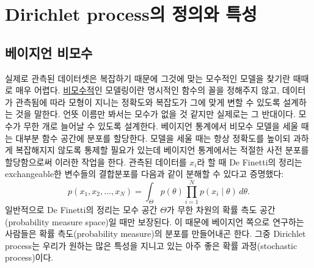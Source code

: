 \documentclass[a4paper, 10pt]{book}
\begin{document}
\nocite{*}

\chapter{Dirichlet process의 정의와 특성}

\section{베이지언 비모수}
  실제로 관측된 데이터셋은 복잡하기 때문에 그것에 맞는 모수적인 모델을 찾기란 때때로 매우 어렵다. \underline{비모수적}인 모델링이란 명시적인 함수의 꼴을 정해주지 않고, 데이터가 관측됨에 따라 모형이 지니는 정확도와 복잡도가 그에 맞게 변할 수 있도록 설계하는 것을 말한다. 언뜻 이름만 봐서는 모수가 없을 것 같지만 실제로는 그 반대이다. 모수가 무한 개로 늘어날 수 있도록 설계한다. 베이지언 통계에서 비모수 모델을 세울 때는 대부분 함수 공간에 분포를 할당한다. 모델을 세울 때는 항상 정확도를 높이되 과하게 복잡해지지 않도록 통제할 필요가 있는데 베이지언 통계에서는 적절한 사전 분포를 할당함으로써 이러한 작업을 한다. 관측된 데이터를 $x_{i}$라 할 때 De Finetti의 정리는 exchangeable한 변수들의 결합분포를 다음과 같이 분해할 수 있다고 증명했다:
  $$
    p\left(x_{1},x_{2},\ldots,x_{N}\right) = \int_{\Theta}p\left(\theta\right)\prod_{i=1}^{N}p\left(x_{i}\middle|\theta\right)\,d\theta.
  $$
  일반적으로 De Finetti의 정리는 모수 공간 $\Theta$가 무한 차원의 확률 측도 공간(probability measure space)일 때만 보장된다. 이 때문에 베이지언 쪽으로 연구하는 사람들은 확률 측도(probability measure)의 분포를 만들어내곤 한다. 그중 Dirichlet process는 우리가 원하는 많은 특성을 지니고 있는 아주 좋은 확률 과정(stochastic process)이다.
\end{document}
